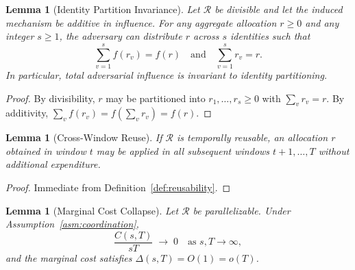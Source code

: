 \documentclass[10pt,journal,compsoc]{IEEEtran}
\newtheorem{lemma}[theorem]{Lemma}
\theoremstyle{remark}
\begin{document}
	\begin{lemma}[Identity Partition Invariance]
		\label{lem:partition}
		Let $\mathcal{R}$ be divisible and let the induced
		mechanism be additive in influence.
		For any aggregate allocation $r \geq 0$ and any
		integer $s \geq 1$, the adversary can distribute
		$r$ across $s$ identities such that
		\[
		\sum_{v=1}^{s} f(r_v) = f(r)
		\quad \text{and} \quad
		\sum_{v=1}^{s} r_v = r.
		\]
		In particular, total adversarial influence is invariant
		to identity partitioning.
	\end{lemma}
	
	\begin{proof}
		By divisibility, $r$ may be partitioned into
		$r_1, \ldots, r_s \geq 0$ with $\sum_v r_v = r$.
		By additivity, $\sum_v f(r_v) = f(\sum_v r_v) = f(r)$.
	\end{proof}
	
	\begin{lemma}[Cross-Window Reuse]
		\label{lem:reuse}
		If $\mathcal{R}$ is temporally reusable, an allocation
		$r$ obtained in window $t$ may be applied in all
		subsequent windows $t+1, \ldots, T$ without additional
		expenditure.
	\end{lemma}
	
	\begin{proof}
		Immediate from Definition~\ref{def:reusability}.
	\end{proof}
	
	\begin{lemma}[Marginal Cost Collapse]
		\label{lem:collapse}
		Let $\mathcal{R}$ be parallelizable.
		Under Assumption~\ref{asm:coordination},
		\begin{equation}
			\frac{C(s, T)}{sT} \;\to\; 0
			\quad \text{as } s, T \to \infty,
		\end{equation}
		and the marginal cost satisfies
		$\Delta(s, T) = O(1) = o(T)$.
	\end{lemma}
	
\end{document}
